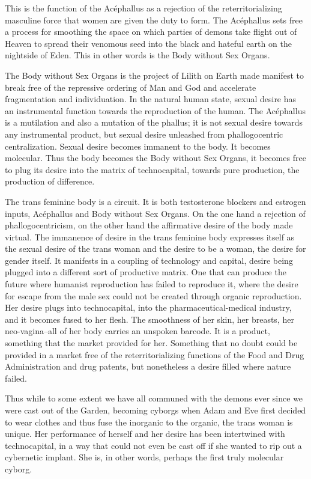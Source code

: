 \documentclass[12pt, a5paper, twoside, openright]{memoir}
\begin{document}
This is the function of the Acéphallus as a rejection of the reterritorializing masculine force that women are given the duty to form. The Acéphallus sets free a process for smoothing the space on which parties of demons take flight out of Heaven to spread their venomous seed into the black and hateful earth on the nightside of Eden. This in other words is the Body without Sex Organs.

The Body without Sex Organs is the project of Lilith on Earth made manifest to break free of the repressive ordering of Man and God and accelerate fragmentation and individuation. In the natural human state, sexual desire has an instrumental function towards the reproduction of the human. The Acéphallus is a mutilation and also a mutation of the phallus; it is not sexual desire towards any instrumental product, but sexual desire unleashed from phallogocentric centralization. Sexual desire becomes immanent to the body. It becomes molecular. Thus the body becomes the Body without Sex Organs, it becomes free to plug its desire into the matrix of technocapital, towards pure production, the production of difference.

The trans feminine body is a circuit. It is both testosterone blockers and estrogen inputs, Acéphallus and Body without Sex Organs. On the one hand a rejection of phallogocentricism, on the other hand the affirmative desire of the body made virtual. The immanence of desire in the trans feminine body expresses itself as the sexual desire of the trans woman and the desire to be a woman, the desire for gender itself. It manifests in a coupling of technology and capital, desire being plugged into a different sort of productive matrix. One that can produce the future where humanist reproduction has failed to reproduce it, where the desire for escape from the male sex could not be created through organic reproduction. Her desire plugs into technocapital, into the pharmaceutical-medical industry, and it becomes fused to her flesh. The smoothness of her skin, her breasts, her neo-vagina--all of her body carries an unspoken barcode. It is a product, something that the market provided for her. Something that no doubt could be provided in a market free of the reterritorializing functions of the Food and Drug Administration and drug patents, but nonetheless a desire filled where nature failed.

Thus while to some extent we have all communed with the demons ever since we were cast out of the Garden, becoming cyborgs when Adam and Eve first decided to wear clothes and thus fuse the inorganic to the organic, the trans woman is unique. Her performance of herself and her desire has been intertwined with technocapital, in a way that could not even be cast off if she wanted to rip out a cybernetic implant. She is, in other words, perhaps the first truly molecular cyborg.
\end{document}
